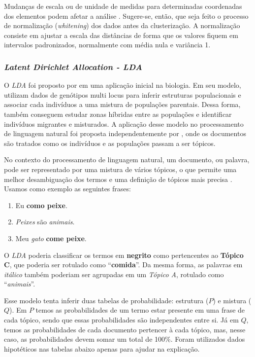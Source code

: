 Mudanças de escala ou de unidade de medidas para determinadas coordenadas dos elementos podem afetar a análise \cite{cole1998}. Sugere-se, então, que seja feito o processo de normalização (\textit{whitening}) dos dados antes da clusterização. A normalização consiste em ajustar a escala das distâncias de forma que os valores fiquem em intervalos padronizados, normalmente com média nula e variância 1.


\subsubsection{\textit{Latent Dirichlet Allocation - LDA}}

O \textit{LDA} foi proposto por  em uma aplicação inicial na biologia. Em seu modelo,  utilizam dados de genótipos multi locus para inferir estruturas populacionais e associar cada indivíduos a uma mistura de populações parentais. Dessa forma, também conseguem estudar zonas híbridas entre as populações e identificar indivíduos migrantes e misturados. A aplicação desse modelo no processamento de linguagem natural foi proposta independentemente por , onde os documentos são tratados como os indivíduos e as populações passam a ser tópicos.

No contexto do processamento de linguagem natural, um documento, ou palavra, pode ser representado por uma mistura de vários tópicos, o que permite uma melhor desambiguação dos termos e uma definição de tópicos mais precisa \cite{girolami}. Usamos como exemplo as seguintes frases:

\begin{enumerate}
  \item Eu \textbf{como peixe}.
  \item \textit{Peixes} são \textit{animais}.
  \item Meu \textit{gato} \textbf{come peixe}.
\end{enumerate}

O \textit{LDA} poderia classificar os termos em \textbf{negrito} como pertencentes ao \textbf{Tópico C}, que poderia ser rotulado como ``\textbf{comida}''. Da mesma forma, as palavras em \textit{itálico} também poderiam ser agrupadas em um \textit{Tópico A}, rotulado como ``\textit{animais}''.

Esse modelo tenta inferir duas tabelas de probabilidade: estrutura (\(P\)) e mistura (\(Q\)). Em \(P\) temos as probabilidades de um termo estar presente em uma frase de cada tópico, sendo que essas probabilidades são independentes entre si. Já em \(Q\), temos as probabilidades de cada documento pertencer à cada tópico, mas, nesse caso, as probabilidades devem somar um total de 100\%. Foram utilizados dados hipotéticos nas tabelas abaixo apenas para ajudar na explicação.

